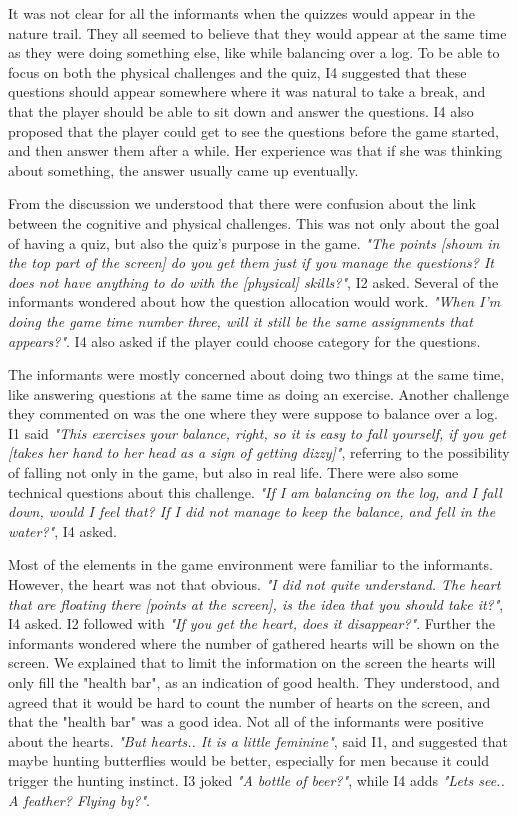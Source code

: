 It was not clear for all the informants when the quizzes would appear in the nature trail. They all seemed to believe that they would appear at the same time as they were doing something else, like while balancing over a log. To be able to focus on both the physical challenges and the quiz, I4 suggested that these questions should appear somewhere where it was natural to take a break, and that the player should be able to sit down and answer the questions. I4 also proposed that the player could get to see the questions before the game started, and then answer them after a while. Her experience was that if she was thinking about something, the answer usually came up eventually. 

From the discussion we understood that there were confusion about the link between the cognitive and physical challenges. This was not only about the goal of having a quiz, but also the quiz's purpose in the game. \emph{"The points [shown in the top part of the screen] do you get them just if you manage the questions? It does not have anything to do with the [physical] skills?"}, I2 asked. Several of the informants wondered about how the question allocation would work. \emph{"When I'm doing the game time number three, will it still be the same assignments that appears?"}. I4 also asked if the player could choose category for the questions.  

The informants were mostly concerned about doing two things at the same time, like answering questions at the same time as doing an exercise. Another challenge they commented on was the one where they were suppose to balance over a log. I1 said \emph{"This exercises your balance, right, so it is easy to fall yourself, if you get [takes her hand to her head as a sign of getting dizzy]"}, referring to the possibility of falling not only in the game, but also in real life. There were also some technical questions about this challenge. \emph{"If I am balancing on the log, and I fall down, would I feel that? If I did not manage to keep the balance, and fell in the water?"}, I4 asked. 

Most of the elements in the game environment were familiar to the informants. However, the heart was not that obvious. \emph{"I did not quite understand. The heart that are floating there [points at the screen], is the idea that you should take it?"}, I4 asked. I2 followed with \emph{"If you get the heart, does it disappear?"}. Further the informants wondered where the number of gathered hearts will be shown on the screen. We explained that to limit the information on the screen the hearts will only fill the "health bar", as an indication of good health. They understood, and agreed that it would be hard to count the number of hearts on the screen, and that the "health bar" was a good idea. Not all of the informants were positive about the hearts. \emph{"But hearts.. It is a little feminine"}, said I1, and suggested that maybe hunting butterflies would be better, especially for men because it could trigger the hunting instinct. I3 joked \emph{"A bottle of beer?"}, while I4 adds \emph{"Lets see.. A feather? Flying by?"}. 

